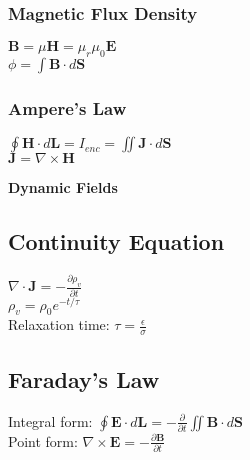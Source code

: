 \documentclass[12pt]{exam}
\begin{document}
\begin{multicols}{2}
\begin{flushleft}
	\subsubsection*{Magnetic Flux Density}
				\vspace{0.1in}
	{ \addtolength{\leftskip}{0.5in}
		$\mathbf{B} = \mu\mathbf{H} = \mu_r\mu_0\mathbf{E}$ \\[4pt]
		$\phi = \int\mathbf{B}\cdot d\mathbf{S} $ \\
	}
			\vspace{0.1in}
	
	\subsubsection*{Ampere's Law}
				\vspace{0.1in}
	{ \addtolength{\leftskip}{0.5in}
		$\oint\mathbf{H}\cdot d\mathbf{L} = I_{enc} = \iint \mathbf{J} \cdot d\mathbf{S}$ \\[4pt]
		$\mathbf{J} = \nabla \times \mathbf{H}$ \\
	}

\vspace{0.5in}
\huge
\textbf{Dynamic Fields}
\normalsize
\vspace{0.2in}
\subsection*{Continuity Equation}
{ \addtolength{\leftskip}{0.5in}
	$\nabla \cdot \mathbf{J} = -\frac{\partial \rho_v}{\partial t}$ \\[6pt]
	$\rho_v = \rho_0 e^{-t/\tau}$ \\[6pt]
	Relaxation time: 	$\tau = \frac{\epsilon}{\sigma}$ \\[6pt]
}

\normalsize
\vspace{0.2in}
\subsection*{Faraday's Law}
{ \addtolength{\leftskip}{0.5in}
	Integral form:	$\oint \mathbf{E} \cdot d\mathbf{L} = -\frac{\partial}{\partial t}\iint \mathbf{B}\cdot d\mathbf{S}$ \\[6pt]
	Point form: $\nabla \times \mathbf{E} =-\frac{\partial \mathbf{B}}{\partial t}$ \\[6pt]
	}


	
	
\end{flushleft}
\end{multicols}
\end{document}

